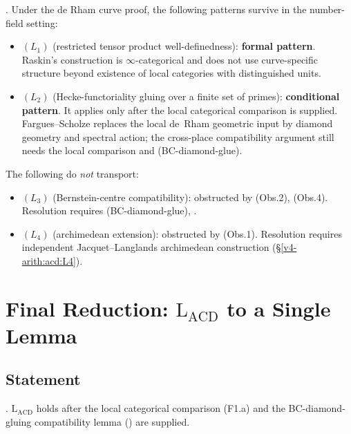 \begin{corollary}
\label{v4-arith:acd:cor:transport-summary}
\ClaimStatusProvedHere. Under the de Rham curve proof, the
following patterns survive in the number-field setting:
\begin{itemize}
\item \((L_{1})\) (restricted tensor product well-definedness):
\textbf{formal pattern}. Raskin's construction is
\(\infty\)-categorical and does not use curve-specific structure beyond
existence of local categories with distinguished units.
\item \((L_{2})\) (Hecke-functoriality gluing over a finite set of
primes): \textbf{conditional pattern}. It applies only after the local
categorical comparison is supplied. Fargues--Scholze replaces the local de~Rham
geometric input by diamond geometry and spectral action; the
cross-place compatibility argument still needs the local comparison
and (BC-diamond-glue).
\end{itemize}
The following do \emph{not} transport:
\begin{itemize}
\item \((L_{3})\) (Bernstein-centre compatibility): obstructed by
(Obs.2), (Obs.4). Resolution requires (BC-diamond-glue),
.
\item \((L_{4})\) (archimedean extension): obstructed by (Obs.1).
Resolution requires independent Jacquet--Langlands archimedean
construction (\S\ref{v4-arith:acd:L4}).
\end{itemize}
\end{corollary}

\section{Final Reduction: \(\mathrm{L}_{\mathrm{ACD}}\) to a Single Lemma}
\label{v4-arith:acd:final-reduction}

\subsection{Statement}

\begin{theorem}
\label{v4-arith:acd:thm:LACD-single-lemma}
\ClaimStatusNeedsVerification. \(\mathrm{L}_{\mathrm{ACD}}\) holds after
the local categorical comparison (F1.a) and the BC-diamond-gluing
compatibility lemma
() are supplied.
\end{theorem}

